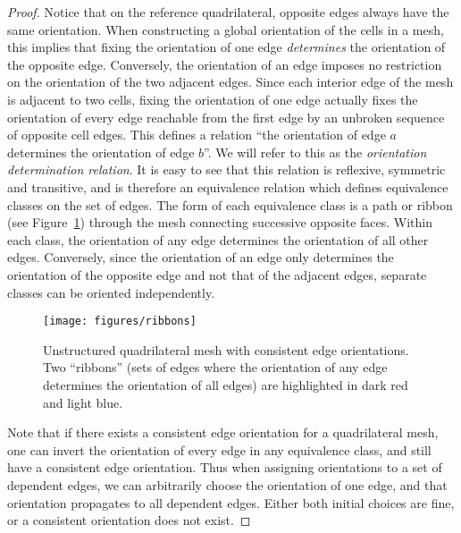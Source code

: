 \documentclass[oneeqnum,onethmnum,onefignum,onetabnum]{siamltex1213}
\begin{document}
\begin{proof}
  Notice that on the reference quadrilateral, opposite edges always have the
  same orientation. When constructing a global orientation of the cells in a
  mesh, this implies that fixing the orientation of one edge
  \emph{determines} the orientation of the opposite edge. Conversely, the
  orientation of an edge imposes no restriction on the orientation of the
  two adjacent edges. Since each interior edge of the mesh is adjacent to
  two cells, fixing the orientation of one edge actually fixes the
  orientation of every edge reachable from the first edge by an unbroken
  sequence of opposite cell edges. This defines a relation ``the orientation
  of edge $a$ determines the orientation of edge $b$''.  We will refer to
  this as the \emph{orientation determination relation}. It is easy to see
  that this relation is reflexive, symmetric and transitive, and is
  therefore an equivalence relation which defines equivalence classes on
  the set of edges. The form of each equivalence class is a path or ribbon
  (see Figure~\ref{fig:ribbons})
  through the mesh connecting successive opposite faces. Within each class,
  the orientation of any edge determines the orientation of all other
  edges. Conversely, since the orientation of an edge only determines the
  orientation of the opposite edge and not that of the adjacent edges,
  separate classes can be oriented independently.

\begin{figure}
  \centering
  \texttt{[image: figures/ribbons]}

  \caption{Unstructured quadrilateral mesh with consistent edge
    orientations. Two ``ribbons'' (sets of edges where the orientation
    of any edge determines the orientation of all edges) are
    highlighted in dark red and light blue.}
  \label{fig:ribbons}
\end{figure}

Note that if there exists a consistent edge orientation for a quadrilateral
mesh, one can invert the orientation of every edge in any equivalence class,
and still have a consistent edge orientation. Thus when assigning
orientations to a set of dependent edges, we can arbitrarily choose the
orientation of one edge, and that orientation propagates to all dependent
edges. Either both initial choices are fine, or a consistent orientation
does not exist.


\end{proof}
\end{document}
